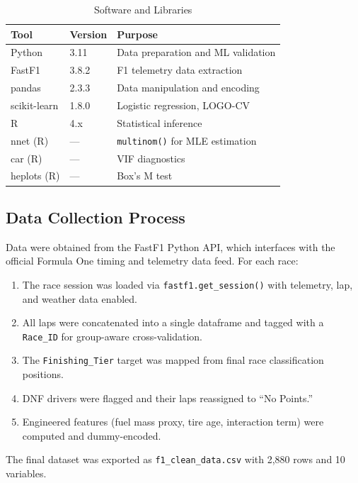 \begin{table}[htbp]
  \centering
  \caption{Software and Libraries}
  \label{tab:tools}
  \begin{tabular}{lll}
    \toprule
    \textbf{Tool} & \textbf{Version} & \textbf{Purpose} \\
    \midrule
    Python & 3.11 & Data preparation and ML validation \\
    FastF1 & 3.8.2 & F1 telemetry data extraction \\
    pandas & 2.3.3 & Data manipulation and encoding \\
    scikit-learn & 1.8.0 & Logistic regression, LOGO-CV \\
    R & 4.x & Statistical inference \\
    nnet (R) & --- & \texttt{multinom()} for MLE estimation \\
    car (R) & --- & VIF diagnostics \\
    heplots (R) & --- & Box's M test \\
    \bottomrule
  \end{tabular}
\end{table}

\subsection{Data Collection Process}

Data were obtained from the FastF1 Python API, which interfaces with the
official Formula One timing and telemetry data feed. For each race:

\begin{enumerate}
  \item The race session was loaded via \texttt{fastf1.get\_session()} with
    telemetry, lap, and weather data enabled.
  \item All laps were concatenated into a single dataframe and tagged with a
    \texttt{Race\_ID} for group-aware cross-validation.
  \item The \texttt{Finishing\_Tier} target was mapped from final race
    classification positions.
  \item DNF drivers were flagged and their laps reassigned to ``No Points.''
  \item Engineered features (fuel mass proxy, tire age, interaction term)
    were computed and dummy-encoded.
\end{enumerate}

The final dataset was exported as \texttt{f1\_clean\_data.csv} with 2,880
rows and 10 variables.

